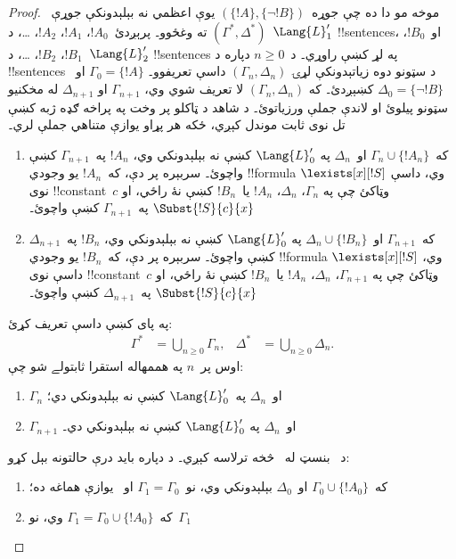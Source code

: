 \documentclass[../../../include/open-logic-section]{subfiles}
\begin{document}
\begin{proof}
موخه مو دا ده چې جوړه~$(\{ !A \}, \{\lnot!B\})$ يوې اعظمي نه
بېلېدونکې جوړې~$(\Gamma^*, \Delta^*)$ ته وغځوو۔ پرېږدئ~$!A_0$،
$!A_1$، $!A_2$، \dots، د~$\Lang{L}'_1$ !!{sentence}s، او~$!B_0$،
$!B_1$، $!B_2$، \dots، د~$\Lang{L}'_2$ !!{sentence}s په لړ کښې
راوړي۔
د~$n \ge 0$ دپاره د !!{sentence}s د سټونو دوه زياتېدونکې لړۍ
$(\Gamma_n, \Delta_n)$ داسې تعريفوو۔
$\Gamma_0 = \{ !A\}$ او~$\Delta_0 = \{\lnot !B \}$ کښېږدئ۔ که
$(\Gamma_n, \Delta_n)$ لا تعريف شوي وي، $\Gamma_{n+1}$ او
$\Delta_{n+1}$ له مخکنيو سټونو پيلوئ او لاندې جملې ورزياتوئ۔ د شاهد د ټاکلو پر وخت په پراخه ګډه ژبه کښې تل نوى ثابت موندل کېږي، ځکه هر پړاو يوازې متناهي جملې لري۔
\begin{enumerate}
\item که~$\Gamma_n \cup \{!A_n \}$ او~$\Delta_n$ په
  $\Lang{L}'_0$ کښې نه بېلېدونکي وي، $!A_n$ په~$\Gamma_{n+1}$ کښې
  واچوئ۔ سربېره پر دې، که~$!A_n$ يو وجودي !!{formula}
  $\lexists[x][!S]$ وي، داسې نوی !!{constant}~$c$ وټاکئ چې په
  $\Gamma_n$، $\Delta_n$، $!A_n$ يا~$!B_n$ کښې نۀ راځي، او
  $\Subst{!S}{c}{x}$ په~$\Gamma_{n+1}$ کښې واچوئ۔
\item که~$\Gamma_{n+1}$ او~$\Delta_n \cup \{!B_n \}$ په
  $\Lang{L}'_0$ کښې نه بېلېدونکي وي، $!B_n$ په~$\Delta_{n+1}$ کښې
  واچوئ۔ سربېره پر دې، که~$!B_n$ يو وجودي !!{formula}
  $\lexists[x][!S]$ وي، داسې نوی !!{constant}~$c$ وټاکئ چې په
  $\Gamma_{n+1}$، $\Delta_n$، $!A_n$ يا~$!B_n$ کښې نۀ راځي، او
  $\Subst{!S}{c}{x}$ په~$\Delta_{n+1}$ کښې واچوئ۔
\end{enumerate}
په پای کښې داسې تعريف کړئ:
\begin{align*}
  \Gamma^* & = \bigcup_{n\ge 0} \Gamma_n, &
  \Delta^* & = \bigcup_{n\ge 0} \Delta_n.
\end{align*}
اوس پر~$n$ په هممهاله استقرا ثابتولے شو چې:
\begin{enumerate}
\item{} $\Gamma_n$ او~$\Delta_n$ په~$\Lang{L}'_0$
  کښې نه بېلېدونکي دي؛
\item{} $\Gamma_{n+1}$ او~$\Delta_n$ په
  $\Lang{L}'_0$ کښې نه بېلېدونکي دي۔
\end{enumerate}
د~ بنسټ له~ څخه ترلاسه کېږي۔ د
 دپاره بايد درې حالتونه بېل کړو:
\begin{enumerate}
\item که~$\Gamma_0 \cup \{!A_0 \}$ او~$\Delta_0$ بېلېدونکي وي،
  نو~$\Gamma_1 = \Gamma_0$ او~ يوازې هماغه
   ده؛
\item که~$\Gamma_1 = \Gamma_0 \cup\{ !A_0\}$ وي، نو~$\Gamma_1$

\end{enumerate}
\end{proof}
\end{document}
